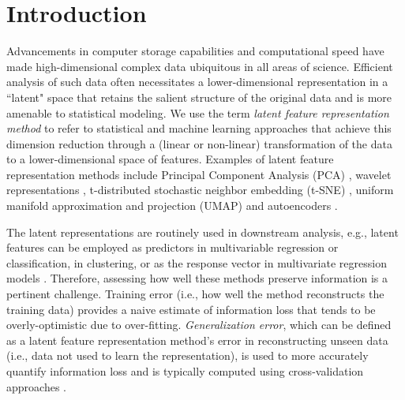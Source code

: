 \section{Introduction}

Advancements in computer storage capabilities and computational speed have made high-dimensional complex data ubiquitous in all areas of science.
Efficient analysis of such data often necessitates a lower-dimensional representation in a ``latent" space that retains the salient structure of the original data and is more amenable to statistical modeling.
We use the term \emph{latent feature representation method} to refer to statistical and machine learning approaches that achieve this dimension reduction through a (linear or non-linear) transformation of the data to a lower-dimensional space of features.
Examples of latent feature representation methods include Principal Component Analysis (PCA) \parencite{hotelling_analysis_1933}, wavelet representations \parencite{daubechies_wavelet_1990}, t-distributed stochastic neighbor embedding (t-SNE) \parencite{maaten_visualizing_2008}, uniform manifold approximation and projection (UMAP) \parencite{mcinnes_umap_2020} and autoencoders \parencite{rumelhart_learning_1986}.

The latent representations are routinely used in downstream analysis, e.g., latent features can be employed as predictors in multivariable regression or classification, in clustering, or as the response vector in multivariate regression models \parencite{niu_dimensionality_2011,wang_role_2014, cook_fisher_2007}. 
Therefore, assessing how well these methods preserve information is a pertinent challenge.
Training error (i.e., how well the method reconstructs the training data) provides a naive estimate of information loss that tends to be overly-optimistic due to over-fitting.
\emph{Generalization error}, which can be defined as a latent feature representation method's error in reconstructing unseen data (i.e., data not used to learn the representation), is used to more accurately quantify information loss and is typically computed using cross-validation approaches \parencite[see, e.g.,][]{becht_dimensionality_2019, bro_cross-validation_2008, wold_cross-validatory_1978, eastment_cross-validatory_1982,krzanowski_cross-validation_1987, minka_automatic_2000, rajan_bayesian_1994, camacho_cross-validation_2014, diana_cross-validation_2002, hubert_fast_2007, josse_selecting_2012, saccenti_use_2015}.

